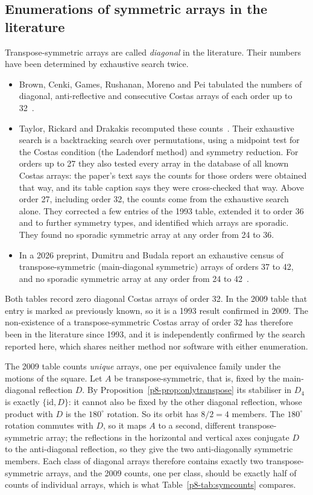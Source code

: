 \documentclass[11pt,a4paper,oneside]{report}
\theoremstyle{definition}
\begin{document}
\subsection{Enumerations of symmetric arrays in the literature}\label{p8-sec:censuses}
Transpose-symmetric arrays are called \emph{diagonal} in the literature. Their numbers have been
determined by exhaustive search twice.
\begin{itemize}
\item Brown, Cenki, Games, Rushanan, Moreno and Pei tabulated the numbers of diagonal,
anti-reflective and consecutive Costas arrays of each order up to 32~\cite{p8-brown1993}.
\item Taylor, Rickard and Drakakis recomputed these counts~\cite{p8-taylor2009}. Their exhaustive
search is a backtracking search over permutations, using a midpoint test for the Costas condition
(the Ladendorf method) and symmetry reduction. For orders up to 27 they also tested every array in
the database of all known Costas arrays: the paper's text says the counts for those orders were
obtained that way, and its table caption says they were cross-checked that way. Above order 27,
including order 32, the counts come from the exhaustive search alone. They corrected a few entries
of the 1993 table, extended it to order 36 and to further symmetry types, and identified which
arrays are sporadic.
They found no sporadic symmetric array at any order from 24 to 36.
\item In a 2026 preprint, Dumitru and Budala report an exhaustive census of transpose-symmetric
(main-diagonal symmetric) arrays of orders 37 to 42, and no sporadic symmetric array at any order from
24 to 42~\cite{p8-dumitru2026symmetriccensus}.
\end{itemize}
Both tables record zero diagonal Costas arrays of order 32. In the 2009 table that entry is
marked as previously known, so it is a 1993 result confirmed in 2009. The non-existence of a
transpose-symmetric Costas array of order 32 has therefore been in the literature since 1993, and
it is independently confirmed by the search reported here, which shares neither method nor
software with either enumeration.

The 2009 table counts \emph{unique} arrays, one per equivalence family under the motions of the
square. Let $A$ be transpose-symmetric, that is, fixed by the main-diagonal reflection $D$. By
Proposition~\ref{p8-prop:onlytranspose} its stabiliser in $D_4$ is exactly $\{\mathrm{id},D\}$: it
cannot also be fixed by the other diagonal reflection, whose product with $D$ is the $180^\circ$
rotation. So its orbit has $8/2=4$ members. The $180^\circ$ rotation commutes with $D$, so it maps
$A$ to a second, different transpose-symmetric array; the reflections in the horizontal and vertical
axes conjugate $D$ to the anti-diagonal reflection, so they give the two anti-diagonally symmetric
members. Each class of diagonal arrays therefore contains exactly two transpose-symmetric arrays,
and the 2009 counts, one per class, should be exactly half of counts of individual arrays, which is what Table~\ref{p8-tab:symcounts}
compares.
\end{document}
